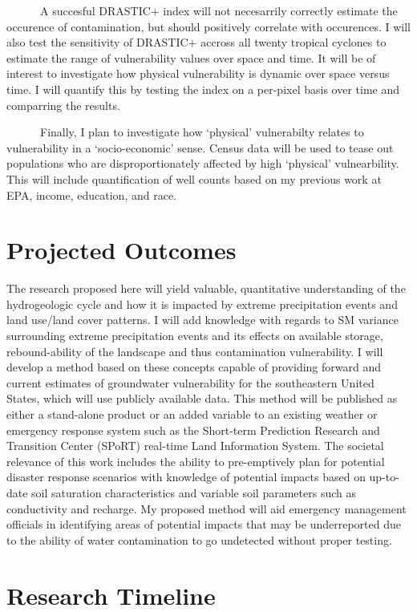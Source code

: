 \documentclass[
]{book}
\begin{document}
~~~~~~A succesful DRASTIC+ index will not necesarrily correctly estimate the occurence of contamination, but should positively correlate with occurences. I will also test the sensitivity of DRASTIC+ accross all twenty tropical cyclones to estimate the range of vulnerability values over space and time. It will be of interest to investigate how physical vulnerability is dynamic over space versus time. I will quantify this by testing the index on a per-pixel basis over time and comparring the results.

~~~~~~Finally, I plan to investigate how `physical' vulnerabilty relates to vulnerability in a `socio-economic' sense. Census data will be used to tease out populations who are disproportionately affected by high `physical' vulnearbility. This will include quantification of well counts based on my previous work at EPA, income, education, and race.

\hypertarget{outcomes}{%
\chapter{Projected Outcomes}\label{outcomes}}

The research proposed here will yield valuable, quantitative understanding of the hydrogeologic cycle and how it is impacted by extreme precipitation events and land use/land cover patterns. I will add knowledge with regards to SM variance surrounding extreme precipitation events and its effects on available storage, rebound-ability of the landscape and thus contamination vulnerability. I will develop a method based on these concepts capable of providing forward and current estimates of groundwater vulnerability for the southeastern United States, which will use publicly available data. This method will be published as either a stand-alone product or an added variable to an existing weather or emergency response system such as the Short-term Prediction Research and Transition Center (SPoRT) real-time Land Information System. The societal relevance of this work includes the ability to pre-emptively plan for potential disaster response scenarios with knowledge of potential impacts based on up-to-date soil saturation characteristics and variable soil parameters such as conductivity and recharge. My proposed method will aid emergency management officials in identifying areas of potential impacts that may be underreported due to the ability of water contamination to go undetected without proper testing.

\hypertarget{timeline}{%
\chapter{Research Timeline}\label{timeline}}
\end{document}
